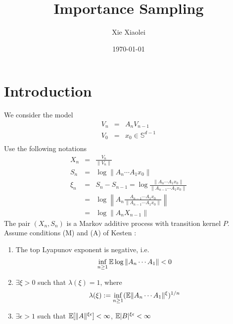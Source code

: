 \documentclass{article}
\title{Importance Sampling}
\author{Xie Xiaolei}
\date{\today}
\begin{document}
\maketitle
\section{Introduction}
We consider the model
\begin{eqnarray*}
V_n &=& A_n V_{n-1} \\
V_0 &=& x_0 \in \mathbb S^{d-1}\\
\end{eqnarray*}
Use the following notations
\begin{eqnarray*}
X_n &=& \frac{V_n}{\|V_n\|} \\
S_n &=& \log \|A_n \cdots A_1 x_0\| \\
\xi_n &=& S_n - S_{n-1} = \log\frac{\|A_n \cdots A_1 x_0\|}{\|A_{n-1}
  \cdots A_1 x_0\|} \\
&=& \log\left\| A_n \frac{A_{n-1} \cdots A_1 x_0}{\|A_{n-1} \cdots A_1
    x_0\|} \right\|\\
&=& \log \|A_n X_{n-1}\|
\end{eqnarray*}
The pair $(X_n, S_n)$ is a Markov additive process with transition
kernel $P$. Assume conditions (M) and (A) of Kesten \cite{Kesten1973}:
\begin{enumerate}
\item The top Lyapunov exponent is negative, i.e.
  \begin{equation}
    \label{eq:neg_top_Lyapunov}
    \inf_{n \geq 1} \mathbb{E} \log \|A_n \cdots A_1\| < 0    
  \end{equation}
\item $\exists \xi > 0$ such that $\lambda(\xi) = 1$, where
  $$
  \lambda(\xi) := \inf_{n \geq 1} (\mathbb{E} \|A_n \cdots A_1\|^\xi)^{1/n}
  $$
\item $\exists \epsilon > 1$ such that $\mathbb{E}[\|A\|^{\xi\epsilon}] <
  \infty$, $\mathbb{E} |B|^{\xi \epsilon} < \infty$

\end{enumerate}
\end{document}
